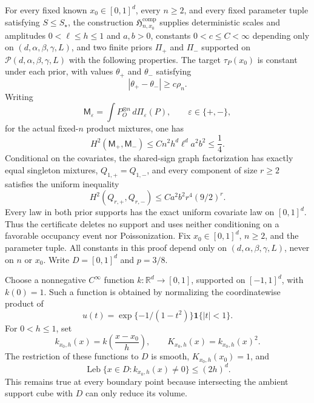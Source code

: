 For every fixed known \(x_0\in[0,1]^d\), every \(n\ge2\), and every fixed parameter tuple satisfying \(S\le S_\star\), the construction \(\mathfrak H_{n,x_0}^{\mathrm{comp}}\) supplies deterministic scales and amplitudes \(0<\ell\le h\le1\) and \(a,b>0\), constants \(0<c\le C<\infty\) depending only on \((d,\alpha,\beta,\gamma,L)\), and two finite priors \(\Pi_+\) and \(\Pi_-\) supported on \(\mathcal P(d,\alpha,\beta,\gamma,L)\) with the following properties.  The target \(\tau_P(x_0)\) is constant under each prior, with values \(\theta_+\) and \(\theta_-\) satisfying
\[
 |\theta_+-\theta_-|\ge c\rho_n.
\]
Writing
\[
 \mathsf M_\varepsilon=\int P_O^{\otimes n}\,d\Pi_\varepsilon(P),
 \qquad \varepsilon\in\{+,-\},
\]
for the actual fixed-\(n\) product mixtures, one has
\[
 H^2(\mathsf M_+,\mathsf M_-)\le
 Cn^2h^d\ell^da^2b^2\le\frac14.
\]
Conditional on the covariates, the shared-sign graph factorization has exactly equal singleton mixtures, \(Q_{1,+}=Q_{1,-}\), and every component of size \(r\ge2\) satisfies the uniform inequality
\[
 H^2(Q_{r,+},Q_{r,-})\le Ca^2b^2r^4(9/2)^r.
\]
Every law in both prior supports has the exact uniform covariate law on \([0,1]^d\).  Thus the certificate deletes no support and uses neither conditioning on a favorable occupancy event nor Poissonization.
Fix \(x_0\in[0,1]^d\), \(n\ge2\), and the parameter tuple.  All constants in this proof depend only on \((d,\alpha,\beta,\gamma,L)\), never on \(n\) or \(x_0\).  Write \(D=[0,1]^d\) and \(p=3/8\).

Choose a nonnegative \(C^\infty\) function \(k:\mathbb R^d\to[0,1]\), supported on \([-1,1]^d\), with \(k(0)=1\).  Such a function is obtained by normalizing the coordinatewise product of
\[
 u(t)=\exp\{-1/(1-t^2)\}\mathbf 1\{|t|<1\}.
\]
For \(0<h\le1\), set
\[
 k_{x_0,h}(x)=k\!\left(\frac{x-x_0}{h}\right),
 \qquad K_{x_0,h}(x)=k_{x_0,h}(x)^2.                                      \tag{1}
\]
The restriction of these functions to \(D\) is smooth, \(K_{x_0,h}(x_0)=1\), and
\[
 \operatorname{Leb}\{x\in D:k_{x_0,h}(x)\ne0\}\le(2h)^d.                \tag{2}
\]
This remains true at every boundary point because intersecting the ambient support cube with \(D\) can only reduce its volume.

